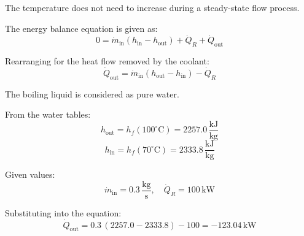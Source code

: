 The temperature does not need to increase during a steady-state flow process.  

The energy balance equation is given as:  
\[
0 = \dot{m}_{\text{in}} (h_{\text{in}} - h_{\text{out}}) + \dot{Q}_R + \dot{Q}_{\text{out}}
\]  

Rearranging for the heat flow removed by the coolant:  
\[
\dot{Q}_{\text{out}} = \dot{m}_{\text{in}} (h_{\text{out}} - h_{\text{in}}) - \dot{Q}_R
\]  

The boiling liquid is considered as pure water.  

From the water tables:  
\[
h_{\text{out}} = h_f(100^\circ\text{C}) = 2257.0 \, \frac{\text{kJ}}{\text{kg}}
\]  
\[
h_{\text{in}} = h_f(70^\circ\text{C}) = 2333.8 \, \frac{\text{kJ}}{\text{kg}}
\]  

Given values:  
\[
\dot{m}_{\text{in}} = 0.3 \, \frac{\text{kg}}{\text{s}}, \quad \dot{Q}_R = 100 \, \text{kW}
\]  

Substituting into the equation:  
\[
\dot{Q}_{\text{out}} = 0.3 \, (2257.0 - 2333.8) - 100 = -123.04 \, \text{kW}
\]